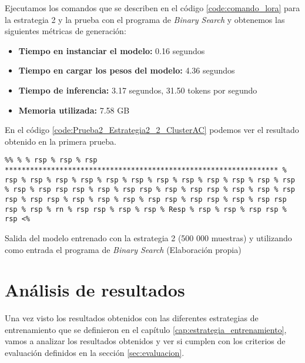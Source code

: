 Ejecutamos los comandos que se describen en el código \ref{code:comando_lora} para
la estrategia 2 y la prueba con el programa de \textit{Binary Search} y obtenemos
las siguientes métricas de generación:

\begin{itemize}
    \item \textbf{Tiempo en instanciar el modelo:} 0.16 segundos
    \item \textbf{Tiempo en cargar los pesos del modelo:} 4.36 segundos
    \item \textbf{Tiempo de inferencia:} 3.17 segundos, 31.50 tokens por segundo
    \item \textbf{Memoria utilizada:} 7.58 GB
\end{itemize}

En el código \ref{code:Prueba2_Estrategia2_2_ClusterAC} podemos ver el resultado obtenido
en la primera prueba.

\begin{mycode}
    \begin{verbatim}
%% % % rsp % rsp % rsp ***************************************************************** % rsp % rsp % rsp % rsp % rsp % rsp % rsp % rsp % rsp % rsp % rsp % rsp % rsp % rsp rsp rsp % rsp % rsp rsp % rsp % rsp rsp % rsp % rsp % rsp rsp % rsp rsp % rsp % rsp % rsp % rsp rsp % rsp rsp % rsp % rsp rsp rsp % rsp % rn % rsp rsp % rsp % rsp % Resp % rsp % rsp % rsp rsp % rsp <%
    \end{verbatim}
    \caption[Salida del modelo entrenado con la estrategia 2 (500 000 muestras) y utilizando como entrada el programa de \textit{Binary Search}]{Salida del modelo entrenado con la estrategia 2 (500 000 muestras) y utilizando como entrada el programa de \textit{Binary Search} (Elaboración propia)}
    \label{code:Prueba2_Estrategia2_2_ClusterAC}
\end{mycode}

\section{Análisis de resultados}
\label{sec:analisis_resultados}


Una vez visto los resultados obtenidos con las diferentes estrategias de entrenamiento
que se definieron en el capítulo \ref{cap:estrategia_entrenamiento}, vamos a analizar
los resultados obtenidos y ver si cumplen con los criterios de evaluación definidos en
la sección \ref{sec:evaluacion}.

